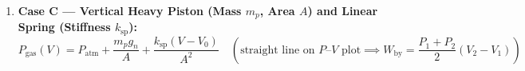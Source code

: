 \begin{formulacard}
\begin{enumerate}
  Side~2 undergoes a \textbf{reversible adiabatic compression} ($Q_2 = 0$), while mechanical equilibrium enforces $P_{1f} = P_{2f} = P_f$:
  \begin{equation}\label{eq:06:piston-adiabatic}
    P_{2i}V_{2i}^{\gamma_2} = P_f V_{2f}^{\gamma_2}, \qquad T_{2f} = T_{2i}\left(\frac{V_{2i}}{V_{2f}}\right)^{\gamma_2 - 1}, \qquad V_{1f} = V_{\mathrm{tot}} - V_{2f}, \qquad Q_{\mathrm{in}} = \Delta U_1 + \Delta U_2 = \frac{P_f V_{1f} - P_{1i}V_{1i}}{\gamma_1 - 1} + \frac{P_f V_{2f} - P_{2i}V_{2i}}{\gamma_2 - 1}
  \end{equation}
  \item \textbf{Case C — Vertical Heavy Piston (Mass $m_p$, Area $A$) and Linear Spring (Stiffness $k_{\mathrm{sp}}$):}
  \begin{equation}\label{eq:06:piston-spring}
    P_{\mathrm{gas}}(V) = P_{\mathrm{atm}} + \frac{m_p g_n}{A} + \frac{k_{\mathrm{sp}}(V - V_0)}{A^2} \quad (\text{straight line on } P\text{--}V \text{ plot} \implies W_{\mathrm{by}} = \frac{P_1 + P_2}{2}(V_2 - V_1))
  \end{equation}
\end{enumerate}
\end{formulacard}

